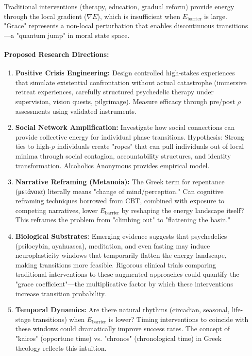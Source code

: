 \documentclass[11pt,a4paper]{article}
\theoremstyle{definition}
\theoremstyle{remark}
\begin{document}
\begin{small}
Traditional interventions (therapy, education, gradual reform) provide energy through the local gradient (\(\nabla E\)), which is insufficient when \(E_{\text{barrier}}\) is large. "Grace" represents a non-local perturbation that enables discontinuous transitions—a "quantum jump" in moral state space.

\paragraph{Proposed Research Directions:}

\begin{enumerate}
    \item \textbf{Positive Crisis Engineering:} Design controlled high-stakes experiences that simulate existential confrontation without actual catastrophe (immersive retreat experiences, carefully structured psychedelic therapy under supervision, vision quests, pilgrimage). Measure efficacy through pre/post \(\rho\) assessments using validated instruments.
    
    \item \textbf{Social Network Amplification:} Investigate how social connections can provide collective energy for individual phase transitions. Hypothesis: Strong ties to high-\(\rho\) individuals create "ropes" that can pull individuals out of local minima through social contagion, accountability structures, and identity transformation. Alcoholics Anonymous provides empirical model.
    
    \item \textbf{Narrative Reframing (Metanoia):} The Greek term for repentance (μετάνοια) literally means "change of mind/perception." Can cognitive reframing techniques borrowed from CBT, combined with exposure to competing narratives, lower \(E_{\text{barrier}}\) by reshaping the energy landscape itself? This reframes the problem from "climbing out" to "flattening the basin."
    
    \item \textbf{Biological Substrates:} Emerging evidence suggests that psychedelics (psilocybin, ayahuasca), meditation, and even fasting may induce neuroplasticity windows that temporarily flatten the energy landscape, making transitions more feasible. Rigorous clinical trials comparing traditional interventions to these augmented approaches could quantify the "grace coefficient"—the multiplicative factor by which these interventions increase transition probability.
    
    \item \textbf{Temporal Dynamics:} Are there natural rhythms (circadian, seasonal, life-stage transitions) when \(E_{\text{barrier}}\) is lower? Timing interventions to coincide with these windows could dramatically improve success rates. The concept of "kairos" (opportune time) vs. "chronos" (chronological time) in Greek theology reflects this intuition.
\end{enumerate}


\end{small}
\end{document}
